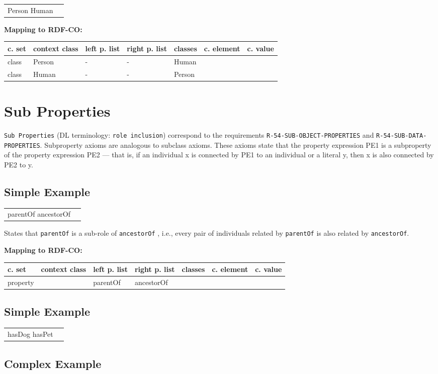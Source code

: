 \documentclass{llncs}
\newcommand{\ms}[1]{\texttt{#1}}
\newenvironment{gcotable}{
  \scriptsize
  \sffamily
  \vspace{0cm}
	\begin{center}
	\textbf{\vspace{0.4cm}Mapping to RDF-CO:} \\
  \begin{tabular}{l|l|l|l|l|l|l}
	\hline
  \textbf{c. set} & \textbf{context class} & \textbf{left p. list} & \textbf{right p. list} & \textbf{classes} & \textbf{c. element} & \textbf{c. value} \\
  \hline

}{
  \hline
  \end{tabular}
	\end{center}
}
\newenvironment{DL}{
\vspace{0cm}
	\begin{center}
  \begin{tabular}{r l}

}{
  \end{tabular}
	\end{center}
}
\begin{document}
\begin{DL}
Person  Human
\end{DL}

\begin{gcotable}
class & Person & - & - & Human &  \\
class & Human & - & - & Person &  \\
\end{gcotable}

\section{Sub Properties}

\ms{Sub Properties} (DL terminology: \ms{role inclusion}) correspond to the requirements \ms{R-54-SUB-OBJECT-PROPERTIES} and \ms{R-54-SUB-DATA-PROPERTIES}.
Subproperty axioms are analogous to subclass axioms.
These axioms state that the property expression PE1 is a subproperty of the property expression PE2 — that is, if an individual x is connected by PE1 to an individual or a literal y, then x is also connected by PE2 to y. 

\subsection{Simple Example}

\begin{DL}
parentOf  ancestorOf 
\end{DL}

States that \ms{parentOf} is a sub-role of \ms{ancestorOf} , i.e., every pair of individuals related by \ms{parentOf} is also related by \ms{ancestorOf}.

\begin{gcotable}
property &  & parentOf & ancestorOf &  &  \\
\end{gcotable}



\subsection{Simple Example}

\begin{DL}
hasDog  hasPet 
\end{DL}



\subsection{Complex Example}
\end{document}
